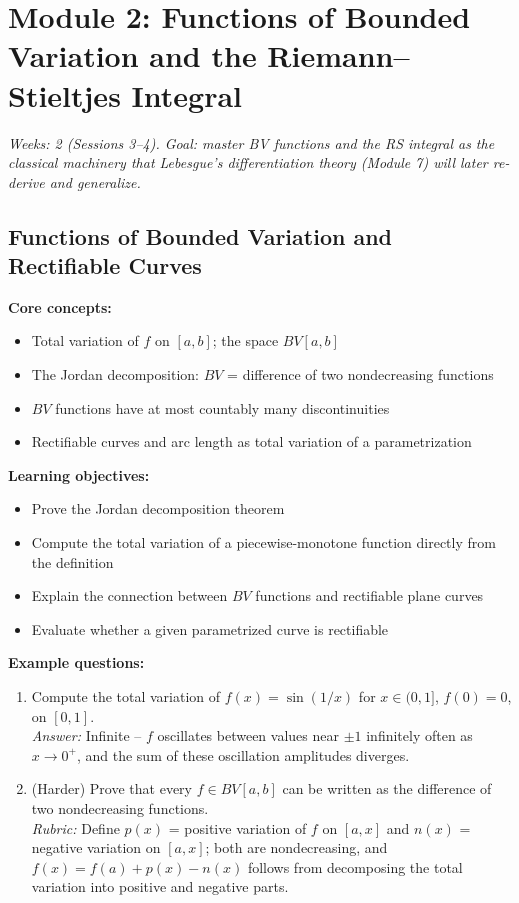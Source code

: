 \documentclass[11pt]{article}
\begin{document}
\section{Module 2: Functions of Bounded Variation and the Riemann--Stieltjes Integral}
\textit{Weeks: 2 (Sessions 3--4). Goal: master BV functions and the RS integral as the classical machinery that Lebesgue's differentiation theory (Module 7) will later re-derive and generalize.}

\subsection{Functions of Bounded Variation and Rectifiable Curves}

\textbf{Core concepts:}
\begin{itemize}[nosep]
\item Total variation of $f$ on $[a,b]$; the space $BV[a,b]$
\item The Jordan decomposition: $BV$ = difference of two nondecreasing functions
\item $BV$ functions have at most countably many discontinuities
\item Rectifiable curves and arc length as total variation of a parametrization
\end{itemize}

\textbf{Learning objectives:}
\begin{itemize}[nosep]
\item Prove the Jordan decomposition theorem
\item Compute the total variation of a piecewise-monotone function directly from the definition
\item Explain the connection between $BV$ functions and rectifiable plane curves
\item Evaluate whether a given parametrized curve is rectifiable
\end{itemize}

\textbf{Example questions:}
\begin{enumerate}[nosep]
\item Compute the total variation of $f(x)=\sin(1/x)$ for $x\in(0,1]$, $f(0)=0$, on $[0,1]$. \\
\textit{Answer:} Infinite -- $f$ oscillates between values near $\pm1$ infinitely often as $x\to0^+$, and the sum of these oscillation amplitudes diverges.
\item (Harder) Prove that every $f\in BV[a,b]$ can be written as the difference of two nondecreasing functions. \\
\textit{Rubric:} Define $p(x)$ = positive variation of $f$ on $[a,x]$ and $n(x)$ = negative variation on $[a,x]$; both are nondecreasing, and $f(x)=f(a)+p(x)-n(x)$ follows from decomposing the total variation into positive and negative parts.
\end{enumerate}
\end{document}
